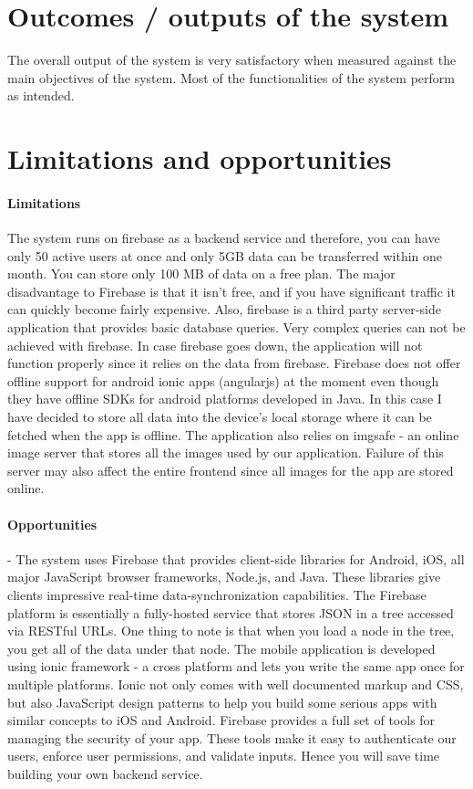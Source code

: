 \section{Outcomes / outputs of the system}
The overall output of the system is very satisfactory when measured against the main objectives of the system. Most of the functionalities of the system perform as intended. 

\section{Limitations and opportunities}
\paragraph{Limitations} 
The system runs on firebase as a backend service and therefore, you can have only 50 active users at once and only 5GB data can be transferred within one month. You can store only 100 MB of data on a free plan. The major disadvantage to Firebase is that it isn't free, and if you have significant traffic it can quickly become fairly expensive. 
Also, firebase is a third party server-side application that provides basic database queries. Very complex queries can not be achieved with firebase. In case firebase goes down, the application will not function properly since it relies on the data from firebase.
Firebase does not offer offline support for android ionic apps (angularjs) at the moment even though they have offline SDKs for android platforms developed in Java. In this case I have decided to store all data into the device's local storage where it can be fetched when the app is offline. 
The application also relies on imgsafe - an online image server that stores all the images used by our application. Failure of this server may also affect the entire frontend since all images for the app are stored online.

\paragraph{Opportunities}
- The system uses Firebase that provides client-side libraries for Android, iOS, all major JavaScript browser frameworks, Node.js, and Java. These libraries give clients impressive real-time data-synchronization capabilities. The Firebase platform is essentially a fully-hosted service that stores JSON in a tree accessed via RESTful URLs. One thing to note is that when you load a node in the tree, you get all of the data under that node. 
The mobile application is developed using ionic framework - a cross platform and lets you write the same app once for multiple platforms. Ionic not only comes with well documented markup and CSS, but also JavaScript design patterns to help you build some serious apps with similar concepts to iOS and Android.
Firebase provides a full set of tools for managing the security of your app. These tools make it easy to authenticate our users, enforce user permissions, and validate inputs. Hence you will save time building your own backend service.



